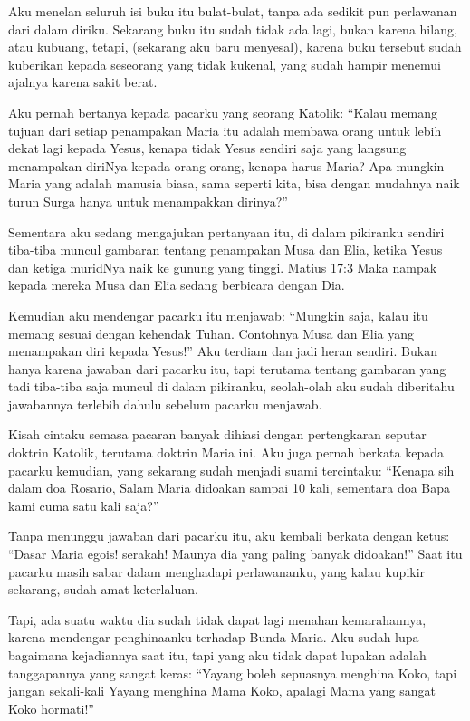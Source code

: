 Aku menelan seluruh isi buku itu bulat-bulat, tanpa ada sedikit pun perlawanan dari dalam diriku. Sekarang buku itu sudah tidak ada lagi, bukan karena hilang, atau kubuang, tetapi, (sekarang aku baru menyesal), karena buku tersebut sudah kuberikan kepada seseorang yang tidak kukenal, yang sudah hampir menemui ajalnya karena sakit berat.

Aku pernah bertanya kepada pacarku yang seorang Katolik:
“Kalau memang tujuan dari setiap penampakan Maria itu adalah membawa orang untuk lebih dekat lagi kepada Yesus, kenapa tidak Yesus sendiri saja yang langsung menampakan diriNya kepada orang-orang, kenapa harus Maria? Apa mungkin Maria yang adalah manusia biasa, sama seperti kita, bisa dengan mudahnya naik turun Surga hanya untuk menampakkan dirinya?”

Sementara aku sedang mengajukan pertanyaan itu, di dalam pikiranku sendiri tiba-tiba muncul gambaran tentang penampakan Musa dan Elia, ketika Yesus dan ketiga muridNya naik ke gunung yang tinggi.
Matius 17:3 Maka nampak kepada mereka Musa dan Elia sedang berbicara dengan Dia.

Kemudian aku mendengar pacarku itu menjawab:
“Mungkin saja, kalau itu memang sesuai dengan kehendak Tuhan. Contohnya Musa dan Elia yang menampakan diri kepada Yesus!”
Aku terdiam dan jadi heran sendiri. Bukan hanya karena jawaban dari pacarku itu, tapi terutama tentang gambaran yang tadi tiba-tiba saja muncul di dalam pikiranku, seolah-olah aku sudah diberitahu jawabannya terlebih dahulu sebelum pacarku menjawab.

Kisah cintaku semasa pacaran banyak dihiasi dengan pertengkaran seputar doktrin Katolik, terutama doktrin Maria ini.
Aku juga pernah berkata kepada pacarku kemudian, yang sekarang sudah menjadi suami tercintaku:
“Kenapa sih dalam doa Rosario, Salam Maria didoakan sampai 10 kali, sementara doa Bapa kami cuma satu kali saja?”

Tanpa menunggu jawaban dari pacarku itu, aku kembali berkata dengan ketus:
“Dasar Maria egois! serakah! Maunya dia yang paling banyak didoakan!”
Saat itu pacarku masih sabar dalam menghadapi perlawananku, yang kalau kupikir sekarang, sudah amat keterlaluan.

Tapi, ada suatu waktu dia sudah tidak dapat lagi menahan kemarahannya, karena mendengar penghinaanku terhadap Bunda Maria. Aku sudah lupa bagaimana kejadiannya saat itu, tapi yang aku tidak dapat lupakan adalah tanggapannya yang sangat keras:
“Yayang boleh sepuasnya menghina Koko, tapi jangan sekali-kali Yayang menghina Mama Koko, apalagi Mama yang sangat Koko hormati!”


